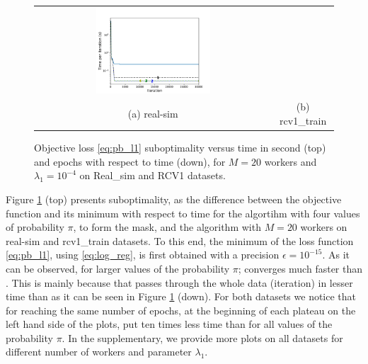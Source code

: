 \begin{figure}[b!]
\begin{tabular}{cc}
\includegraphics[width = 0.5\textwidth]{SODA/Figs/rcv_20w_00001_0001_time_vs_ite.pdf}\\
(a) real-sim & (b) rcv1\_train
\end{tabular}
    \caption{Objective loss \eqref{eq:pb_l1} suboptimality versus time in second (top) and epochs with respect to time (down), for $M=20$ workers and $\lambda_1 = 10^{-4}$ on Real\_sim and RCV1 datasets.}
    \label{fig:speed_conv}
\end{figure}
Figure \ref{fig:speed_conv} (top) presents suboptimality, as the difference between the objective function and its minimum with respect to time for the \SP{} algortihm with four values of probability $\pi$, to form the mask, and the \dave{} algorithm \cite{ICML18} with $M=20$ workers on real-sim and rcv1\_train datasets. To this end, the minimum of the loss function \eqref{eq:pb_l1}, using \eqref{eq:log_reg}, is first obtained with a precision $\epsilon=10^{-15}$. As it can be observed, for larger values of the probability $\pi$; \SP{} converges much faster than \dave{}. This is mainly because that \SP{} passes through the whole data (iteration) in lesser time than \dave{} as it can be seen in Figure \ref{fig:speed_conv} (down). For both datasets we notice that for reaching the same number of epochs, at the beginning of each plateau on the left hand side of the plots,  \SP{} put ten times less time than \dave{} for all values of the probability $\pi$.  In the supplementary, we provide more plots on all datasets for different number of workers and parameter $\lambda_1$.




